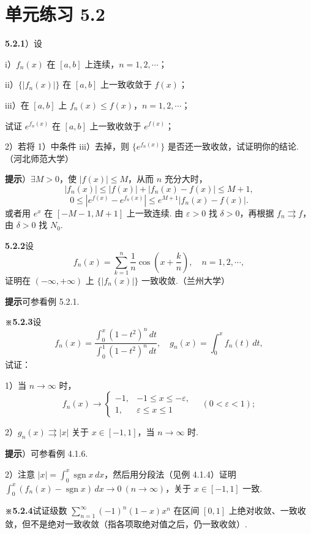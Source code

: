 \documentclass[UTF8,12pt,a4paper,fontset=fandol]{ctexart}
\begin{document}
\section*{单元练习 5.2}

\noindent\textbf{5.2.1}）设

i）$f_n(x)$ 在 $[a,b]$ 上连续，$n=1,2,\cdots$；

ii）$\{|f_n(x)|\}$ 在 $[a,b]$ 上一致收敛于 $f(x)$；

iii）在 $[a,b]$ 上 $f_n(x)\le f(x)$，$n=1,2,\cdots$；

试证 $e^{f_n(x)}$ 在 $[a,b]$ 上一致收敛于 $e^{f(x)}$；

2）若将 1）中条件 iii）去掉，则 $\{e^{f_n(x)}\}$ 是否还一致收敛，试证明你的结论.（河北师范大学）

\noindent\textbf{提示}）$\exists M>0$，使 $|f(x)|\le M$，从而 $n$ 充分大时，
\[
  |f_n(x)|\le |f(x)|+|f_n(x)-f(x)|\le M+1,
\]
\[
  0\le |e^{f(x)}-e^{f_n(x)}|\le e^{M+1}|f_n(x)-f(x)|.
\]
或者用 $e^x$ 在 $[-M-1,M+1]$ 上一致连续. 由 $\varepsilon>0$ 找 $\delta>0$，再根据
$f_n\rightrightarrows f$，由 $\delta>0$ 找 $N_0$.

\noindent\textbf{5.2.2}\quad 设
\[
  f_n(x)=\sum_{k=1}^n\frac1n\cos\left(x+\frac kn\right),\quad n=1,2,\cdots,
\]
证明在 $(-\infty,+\infty)$ 上 $\{|f_n(x)|\}$ 一致收敛.（兰州大学）

\noindent\textbf{提示}\quad 可参看例 5.2.1.

\noindent\textbf{※5.2.3}\quad 设
\[
  f_n(x)=\frac{\displaystyle\int_0^x(1-t^2)^n\,dt}{\displaystyle\int_0^1(1-t^2)^n\,dt},\quad
  g_n(x)=\int_0^x f_n(t)\,dt,
\]
试证：

1）当 $n\to\infty$ 时，
\[
  f_n(x)\to
  \begin{cases}
    -1,&-1\le x\le-\varepsilon,\\
    1,&\varepsilon\le x\le1
  \end{cases}
  \quad(0<\varepsilon<1);
\]

2）$g_n(x)\rightrightarrows |x|$ 关于 $x\in[-1,1]$，当 $n\to\infty$ 时.

\noindent\textbf{提示}）可参看例 4.1.6.

2）注意 $|x|=\displaystyle\int_0^x\operatorname{sgn}x\,dx$，然后用分段法（见例 4.1.4）证明
$\displaystyle\int_0^x(f_n(x)-\operatorname{sgn}x)\,dx\to0\ (n\to\infty)$，关于 $x\in[-1,1]$ 一致.

\noindent\textbf{※5.2.4}\quad 试证级数 $\displaystyle\sum_{n=1}^{\infty}(-1)^n(1-x)x^n$ 在区间 $[0,1]$ 上绝对收敛、一致收敛，但不是绝对一致收敛（指各项取绝对值之后，仍一致收敛）.
\end{document}
